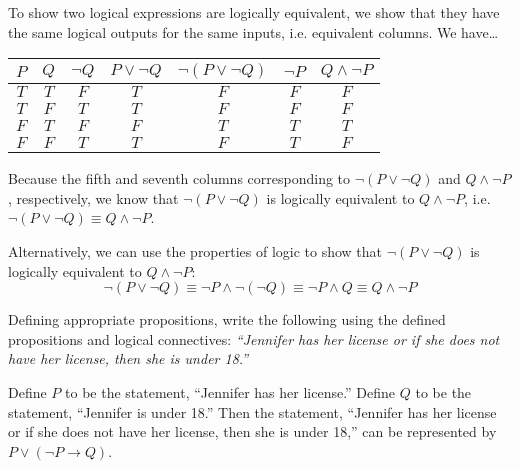 \documentclass[11pt,letterpaper]{article}
\begin{document}
\sol To show two logical expressions are logically equivalent, we show that they have the same logical outputs for the same inputs, i.e. equivalent columns. We have\dots \par
	\begin{table}[h]
	\centering
	\begin{tabular}{c|c||c|c||c||c|c}
	$P$ & $Q$ & $\neg Q$ & $P \vee \neg Q$ & $\neg (P \vee \neg Q)$ & $\neg P$ & $Q \wedge \neg P$ \\ \hline 
	$T$ & $T$ & $F$ & $T$ & $F$ & $F$ & $F$ \\
	$T$ & $F$ & $T$ & $T$ & $F$ & $F$ & $F$ \\
	$F$ & $T$ & $F$ & $F$ & $T$ & $T$ & $T$ \\
	$F$ & $F$ & $T$ & $T$ & $F$ & $T$ & $F$
	\end{tabular}
	\end{table} \par
Because the fifth and seventh columns corresponding to $\neg (P \vee \neg Q)$ and $Q \wedge \neg P$, respectively, we know that $\neg (P \vee \neg Q)$ is logically equivalent to $Q \wedge \neg P$, i.e. $\neg (P \vee \neg Q) \equiv Q \wedge \neg P$. \pspace

Alternatively, we can use the properties of logic to show that $\neg (P \vee \neg Q)$ is logically equivalent to $Q \wedge \neg P$:
	\[
	\neg (P \vee \neg Q) \equiv \neg P \wedge \neg (\neg Q) \equiv \neg P \wedge Q \equiv Q \wedge \neg P
	\]



\newpage



 Defining appropriate propositions, write the following using the defined propositions and logical connectives: {\itshape ``Jennifer has her license or if she does not have her license, then she is under 18.''} \pspace

\sol Define $P$ to be the statement, ``Jennifer has her license.'' Define $Q$ to be the statement, ``Jennifer is under 18.'' Then the statement, ``Jennifer has her license or if she does not have her license, then she is under 18,'' can be represented by $P \vee (\neg P \to Q)$. 
\end{document}
